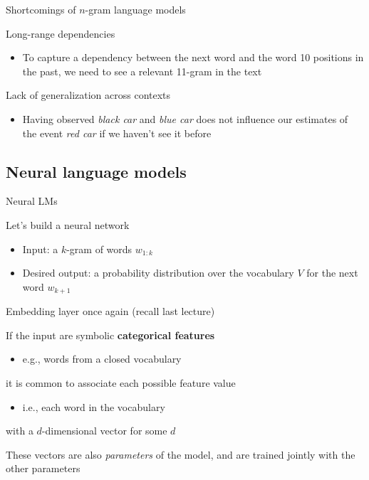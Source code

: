 \documentclass[12pt,aspectratio=169,handout]{beamer}
\begin{document}
\begin{frame}{Shortcomings of $n$-gram language models}

\pause
Long-range dependencies
\begin{itemize}
	\item To capture a dependency between the next word and the word 10 positions in the past, we need to see a relevant 11-gram in the text
\end{itemize}

\pause
Lack of generalization across contexts
\begin{itemize}
	\item Having observed \emph{black car} and \emph{blue car} does not influence our estimates of the event \emph{red car} if we haven't see it before
\end{itemize}


\end{frame}

\subsection{Neural language models}

\begin{frame}{Neural LMs}

Let's build a neural network
\begin{itemize}
	\item Input: a $k$-gram of words $w_{1:k}$
	\item Desired output: a probability distribution over the vocabulary $V$ for the next word $w_{k+1}$
\end{itemize}

\end{frame}

\begin{frame}{Embedding layer once again (recall last lecture)}

If the input are symbolic \textbf{categorical features}
\begin{itemize}
	\item e.g., words from a closed vocabulary
\end{itemize}
it is common to associate each possible feature value
\begin{itemize}
	\item i.e., each word in the vocabulary
\end{itemize}
with a $d$-dimensional vector for some $d$

\bigskip

These vectors are also \emph{parameters} of the model, and are trained jointly with the other parameters

\end{frame}
\end{document}
